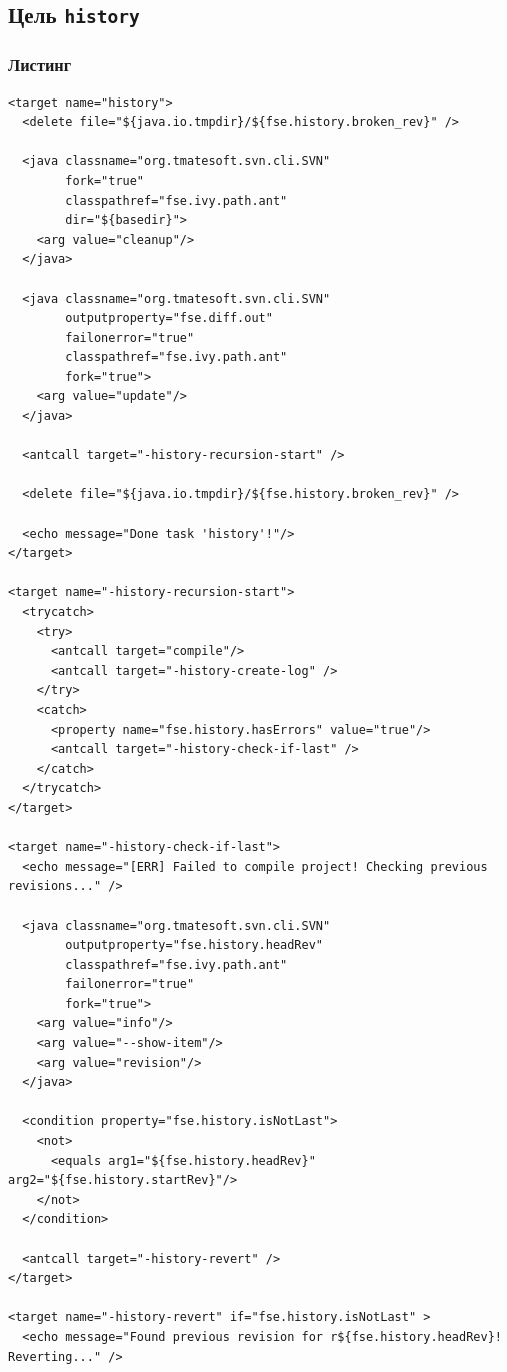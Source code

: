 \subsection{Цель \texttt{history}}

\subsubsection{Листинг}

\begin{lstlisting}[caption={Часть содержимого файла \texttt{build.xml}},captionpos=b]
<target name="history">
  <delete file="${java.io.tmpdir}/${fse.history.broken_rev}" />

  <java classname="org.tmatesoft.svn.cli.SVN"
        fork="true"
        classpathref="fse.ivy.path.ant"
        dir="${basedir}">
    <arg value="cleanup"/>
  </java>

  <java classname="org.tmatesoft.svn.cli.SVN"
        outputproperty="fse.diff.out"
        failonerror="true"
        classpathref="fse.ivy.path.ant"
        fork="true">
    <arg value="update"/>
  </java>

  <antcall target="-history-recursion-start" />

  <delete file="${java.io.tmpdir}/${fse.history.broken_rev}" />

  <echo message="Done task 'history'!"/>
</target>

<target name="-history-recursion-start">
  <trycatch>
    <try>
      <antcall target="compile"/>
      <antcall target="-history-create-log" />
    </try>
    <catch>
      <property name="fse.history.hasErrors" value="true"/>
      <antcall target="-history-check-if-last" />
    </catch>
  </trycatch>
</target>

<target name="-history-check-if-last">
  <echo message="[ERR] Failed to compile project! Checking previous revisions..." />

  <java classname="org.tmatesoft.svn.cli.SVN"
        outputproperty="fse.history.headRev"
        classpathref="fse.ivy.path.ant"
        failonerror="true"
        fork="true">
    <arg value="info"/>
    <arg value="--show-item"/>
    <arg value="revision"/>
  </java>

  <condition property="fse.history.isNotLast">
    <not>
      <equals arg1="${fse.history.headRev}" arg2="${fse.history.startRev}"/>
    </not>
  </condition>

  <antcall target="-history-revert" />
</target>

<target name="-history-revert" if="fse.history.isNotLast" >
  <echo message="Found previous revision for r${fse.history.headRev}! Reverting..." />


\end{lstlisting}

